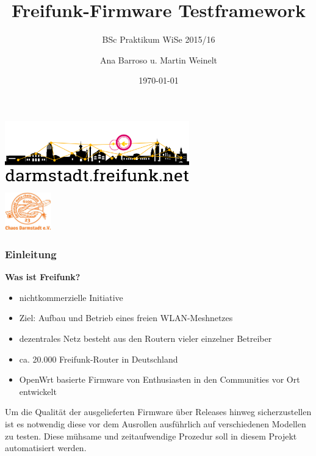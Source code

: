 \documentclass[accentcolor=tud6b,colorbacktitle,inverttitle,landscape,german,presentation,t]{tudbeamer}
\begin{document}
	
	\title[Freifunk-Firmware Testframework]{Freifunk-Firmware Testframework}
	\subtitle{BSc Praktikum WiSe 2015/16}
	
	\author{Ana Barroso u. Martin Weinelt}


	\date{\today}
	
	\begin{titleframe}
		\begin{center}
			\vspace{1cm}
			\includegraphics[width=0.6\textwidth]{images/logo-skyline-text-below}
			\vspace{1.4cm}
		\end{center}
			\flushright
			\includegraphics[width=0.15\textwidth]{images/cda}
	\end{titleframe}
	
	\begin{frame}
		\frametitle{Einleitung}
		\vfill
		\textbf{Was ist Freifunk?}
		\vfill
		\begin{itemize}
			\item nichtkommerzielle Initiative
			\item Ziel: Aufbau und Betrieb eines freien WLAN-Meshnetzes
			\item dezentrales Netz besteht aus den Routern vieler einzelner Betreiber
			\item ca. 20.000 Freifunk-Router in Deutschland
			\item OpenWrt basierte Firmware von Enthusiasten in den Communities vor Ort entwickelt
		\end{itemize}
		\vfill
		\pause
		Um die Qualität der ausgelieferten Firmware über Releases hinweg sicherzustellen ist es notwendig diese vor dem Ausrollen ausführlich auf verschiedenen Modellen zu testen. Diese mühsame und zeitaufwendige Prozedur soll in diesem Projekt automatisiert werden.
	\end{frame}
	
\end{document}
